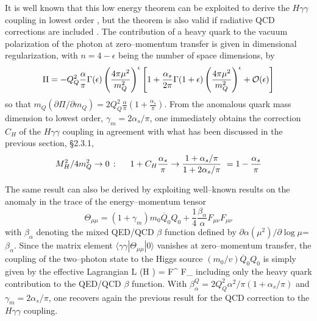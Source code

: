 It is well known that this low energy theorem can be exploited to derive the 
$H \gamma \gamma$ coupling in lowest order \cite{HppBorn,LET}, but the theorem 
is also valid if radiative QCD corrections are included \cite{SDGZ,LET2}. The 
contribution of a heavy quark to the vacuum polarization of the photon at 
zero--momentum transfer is given in dimensional regularization, with 
$n=4-\epsilon$ being the number of space dimensions, by
\begin{eqnarray}
\Pi = - Q_Q^2\frac{\alpha}{\pi} \Gamma(\epsilon)
\left(\frac{4\pi\mu^2}{m_Q^2}\right)^\epsilon \left[ 1+\frac{\alpha_s}{2\pi}
\Gamma(1+\epsilon) \left(\frac{4\pi\mu^2}{m_Q^2}\right)^\epsilon
+ {\cal O} (\epsilon) \right]
\end{eqnarray}
so that $m_Q (\partial \Pi/ \partial m_Q) = 2 Q_Q^2\frac{\alpha}{\pi} \left( 1+
\frac{\alpha_s}{\pi} \right)$. From the anomalous quark mass dimension to
lowest  order, $\gamma_m = 2\alpha_s/\pi$, one immediately obtains the 
correction $C_H$ of the $H \gamma \gamma$ coupling in agreement with what
has been discussed in the previous section, \S2.3.1, 
\begin{eqnarray}
M_H^2/4m_Q^2 \to 0\,: \hspace{0.5cm} 1+
C_H\frac{\alpha_s}{\pi} \to \frac{1+\alpha_s/\pi} {1+2 \alpha_s/\pi}
\ = 1 - \frac{\alpha_s}{\pi}
\end{eqnarray}

The same result can also be derived by exploiting well--known results on the 
anomaly in the trace of the energy--momentum tensor \cite{LET3}
\begin{equation}
\Theta_{\mu\mu} = (1+\gamma_m) m_0 \overline{Q}_0 Q_0 +
\frac{1}{4}\frac{\beta_\alpha}{\alpha} F_{\mu\nu} F_{\mu\nu}
\end{equation}
with $\beta_\alpha$ denoting the mixed QED/QCD $\beta$ function defined by 
$\partial \alpha(\mu^2)/\partial \log \mu$=$\beta_\alpha$. Since the matrix
element $\langle \gamma \gamma | \Theta_{\mu \mu} |0 \rangle$ vanishes at 
zero--momentum transfer, the coupling of the two--photon state to the Higgs 
source $(m_0/v) \overline{Q}_0 Q_0$ is simply given by the effective Lagrangian
\beq
{\cal L} (H \gamma \gamma) =  F^{\mu \nu} F_{\mu \nu} 
  
\eeq
including only the heavy quark contribution to the QED/QCD $\beta$ function.  
With $\beta_\alpha^Q = 2 Q_Q^2 \alpha^2/\pi (1 + \alpha_s/\pi)$ and
$\gamma_m =2\alpha_s/\pi$, one recovers again the previous result for the QCD 
correction to the $H\gamma \gamma$ coupling. 

